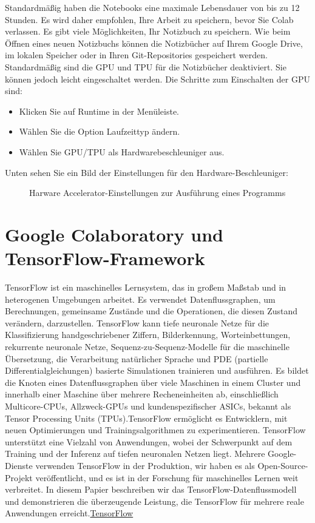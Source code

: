 Standardmäßig haben die Notebooks eine maximale Lebensdauer von bis zu 12 Stunden. Es wird daher empfohlen, Ihre Arbeit zu speichern, bevor Sie Colab verlassen. Es gibt viele Möglichkeiten, Ihr Notizbuch zu speichern. Wie beim Öffnen eines neuen Notizbuchs können die Notizbücher auf Ihrem Google Drive, im lokalen Speicher oder in Ihren Git-Repositories gespeichert werden.
Standardmäßig sind die GPU und TPU für die Notizbücher deaktiviert. Sie können jedoch leicht eingeschaltet werden. Die Schritte zum Einschalten der GPU sind:

\begin{itemize}
	\item Klicken Sie auf Runtime in der Menüleiste.
	\item Wählen Sie die Option Laufzeittyp ändern.
	\item Wählen Sie GPU/TPU als Hardwarebeschleuniger aus.	
\end{itemize}

Unten sehen Sie ein Bild der Einstellungen für den Hardware-Beschleuniger: 

\begin{figure}[H]
	\centering
	\caption{Harware Accelerator-Einstellungen zur Ausführung eines Programms}
\end{figure}


\section{Google Colaboratory und TensorFlow-Framework} 

TensorFlow ist ein maschinelles Lernsystem, das in großem Maßstab und in heterogenen Umgebungen arbeitet. Es verwendet Datenflussgraphen, um Berechnungen, gemeinsame Zustände und die Operationen, die diesen Zustand verändern, darzustellen. TensorFlow kann tiefe neuronale Netze für die Klassifizierung handgeschriebener Ziffern, Bilderkennung, Worteinbettungen, rekurrente neuronale Netze, Sequenz-zu-Sequenz-Modelle für die maschinelle Übersetzung, die Verarbeitung natürlicher Sprache und PDE (partielle Differentialgleichungen) basierte Simulationen trainieren und ausführen. Es bildet die Knoten eines Datenflussgraphen über viele Maschinen in einem Cluster und innerhalb einer Maschine über mehrere Recheneinheiten ab, einschließlich Multicore-CPUs, Allzweck-GPUs und kundenspezifischer ASICs, bekannt als Tensor Processing Units (TPUs).TensorFlow ermöglicht es Entwicklern, mit neuen Optimierungen und Trainingsalgorithmen zu experimentieren. TensorFlow unterstützt eine Vielzahl von Anwendungen, wobei der Schwerpunkt auf dem Training und der Inferenz auf tiefen neuronalen Netzen liegt. Mehrere Google-Dienste verwenden TensorFlow in der Produktion, wir haben es als Open-Source-Projekt veröffentlicht, und es ist in der Forschung für maschinelles Lernen weit verbreitet. In diesem Papier beschreiben wir das TensorFlow-Datenflussmodell und demonstrieren die überzeugende Leistung, die TensorFlow für mehrere reale Anwendungen erreicht.\href{https://www.tensorflow.org/overview/}{TensorFlow}

